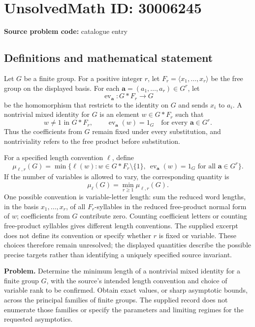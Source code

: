 \documentclass[11pt]{article}
\begin{document}
\section*{UnsolvedMath ID: 30006245}
\textbf{Source problem code:} catalogue entry
\subsection{Definitions and mathematical statement}
Let \(G\) be a finite group. For a positive integer \(r\), let \(F_r=\langle x_1,\ldots,x_r\rangle\) be the free group on the displayed basis. For each \(\mathbf a=(a_1,\ldots,a_r)\in G^r\), let
\[
\operatorname{ev}_{\mathbf a}:G*F_r\longrightarrow G
\]
be the homomorphism that restricts to the identity on \(G\) and sends \(x_i\) to \(a_i\). A nontrivial mixed identity for \(G\) is an element \(w\in G*F_r\) such that
\[
w\ne 1\text{ in }G*F_r,
\qquad
\operatorname{ev}_{\mathbf a}(w)=1_G
\quad\text{for every }\mathbf a\in G^r.
\]
Thus the coefficients from \(G\) remain fixed under every substitution, and nontriviality refers to the free product before substitution.

For a specified length convention \(\ell\), define
\[
\mu_{\ell,r}(G)=\min\bigl\{\ell(w):w\in G*F_r\setminus\{1\},\ \operatorname{ev}_{\mathbf a}(w)=1_G\text{ for all }\mathbf a\in G^r\bigr\}.
\]
If the number of variables is allowed to vary, the corresponding quantity is
\[
\mu_{\ell}(G)=\min_{r\geq 1}\mu_{\ell,r}(G).
\]
One possible convention is variable-letter length: sum the reduced word lengths, in the basis \(x_1,\ldots,x_r\), of all \(F_r\)-syllables in the reduced free-product normal form of \(w\); coefficients from \(G\) contribute zero. Counting coefficient letters or counting free-product syllables gives different length conventions. The supplied excerpt does not define its convention or specify whether \(r\) is fixed or variable. These choices therefore remain unresolved; the displayed quantities describe the possible precise targets rather than identifying a uniquely specified source invariant.

\textbf{Problem.} Determine the minimum length of a nontrivial mixed identity for a finite group \(G\), with the source's intended length convention and choice of variable rank to be confirmed. Obtain exact values, or sharp asymptotic bounds, across the principal families of finite groups. The supplied record does not enumerate those families or specify the parameters and limiting regimes for the requested asymptotics.
\end{document}
